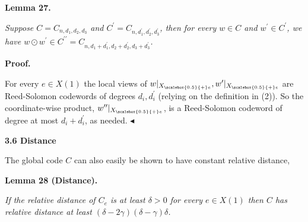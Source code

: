 

\par\medskip\noindent\textbf{
\textbf{Lemma 27}\textbf{.}
}\par



\emph{Suppose $C=C_{n,d_{1},d_{2},d_{3}}$ and $C^{\prime}=C_{n,d^{\prime}_{1},d^{\prime}_{2},d^{\prime}_{3}}$, then for every $w\in C$ and $w^{\prime}\in C^{\prime}$, we have $w\odot w^{\prime}\in C^{\prime\prime}=C_{n,d_{1}+d^{\prime}_{1},d_{2}+d^{\prime}_{2},d_{3}+d^{\prime}_{3}}$.}\par






\par\medskip\noindent\textbf{Proof.}\par




For every $e\in X(1)$ the local views of $w|_{{X}_{\scalebox{0.5}{+}e}},w^{\prime}|_{{X}_{\scalebox{0.5}{+}e}}$ are Reed-Solomon codewords of degrees $d_{i},d^{\prime}_{i}$ (relying on the definition in (2)). So the coordinate-wise product, $w^{\prime\prime}|_{{X}_{\scalebox{0.5}{+}e}}$, is a Reed-Solomon codeword of degree at most $d_{i}+d^{\prime}_{i}$, as needed.
$\blacktriangleleft$\par






\par\medskip\noindent\textbf{
3.6 Distance}\par




The global code $C$ can also easily be shown to have constant relative distance,\par





\par\medskip\noindent\textbf{
\textbf{Lemma 28}\textbf{ }(Distance)\textbf{.}
}\par



\emph{If the relative distance of $C_{e}$ is at least $\delta>0$ for every $e\in X(1)$ then $C$ has relative distance at least $(\delta-2\gamma)(\delta-\gamma)\delta$.}\par




